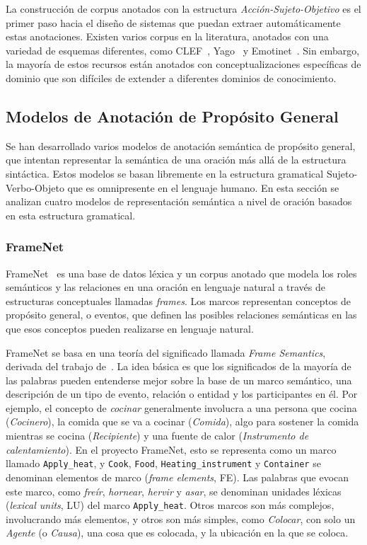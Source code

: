 La construcción de corpus anotados con la estructura \textit{Acción-Sujeto-Objetivo} es el primer paso hacia el diseño de sistemas que puedan extraer automáticamente estas anotaciones.
Existen varios corpus en la literatura, anotados con una variedad de esquemas diferentes, como CLEF~\cite{kelly2016overview}, Yago~\cite{suchanek2007yago} y Emotinet~\cite{Balahur2011}.
Sin embargo, la mayoría de estos recursos están anotados con conceptualizaciones específicas de dominio que son difíciles de extender a diferentes dominios de conocimiento.

\subsection{Modelos de Anotación de Propósito General}\label{sec:general}

Se han desarrollado varios modelos de anotación semántica de propósito general, que intentan representar la semántica de una oración más allá de la estructura sintáctica.
Estos modelos se basan libremente en la estructura gramatical Sujeto-Verbo-Objeto que es omnipresente en el lenguaje humano.
En esta sección se analizan cuatro modelos de representación semántica a nivel de oración basados en esta estructura gramatical.

\subsubsection*{FrameNet}

FrameNet~\cite{framenet} es una base de datos léxica y un corpus anotado que modela los roles semánticos y las relaciones en una oración en lenguaje natural a través de estructuras conceptuales llamadas \textit{frames}.
Los marcos representan conceptos de propósito general, o eventos, que definen las posibles relaciones semánticas en las que esos conceptos pueden realizarse en lenguaje natural.

FrameNet se basa en una teoría del significado llamada \textit{Frame Semantics}, derivada del trabajo de~\citet{fillmore}.
La idea básica es que los significados de la mayoría de las palabras pueden entenderse mejor sobre la base de un marco semántico, una descripción de un tipo de evento, relación o entidad y los participantes en él.
Por ejemplo, el concepto de \textit{cocinar} generalmente involucra a una persona que cocina (\textit{Cocinero}), la comida que se va a cocinar (\textit{Comida}), algo para sostener la comida mientras se cocina (\textit{Recipiente}) y una fuente de calor (\textit{Instrumento de calentamiento}).
En el proyecto FrameNet, esto se representa como un marco llamado \texttt{Apply\_heat}, y \texttt{Cook}, \texttt{Food}, \texttt{Heating\_instrument} y \texttt{Container} se denominan elementos de marco (\textit{frame elements}, FE). Las palabras que evocan este marco, como \textit{freír}, \textit{hornear}, \textit{hervir} y \textit{asar}, se denominan unidades léxicas (\textit{lexical units}, LU) del marco \texttt{Apply\_heat}.
Otros marcos son más complejos, involucrando más elementos, y otros son más simples, como \textit{Colocar}, con solo un \textit{Agente} (o \textit{Causa}), una cosa que es colocada, y la ubicación en la que se coloca.


